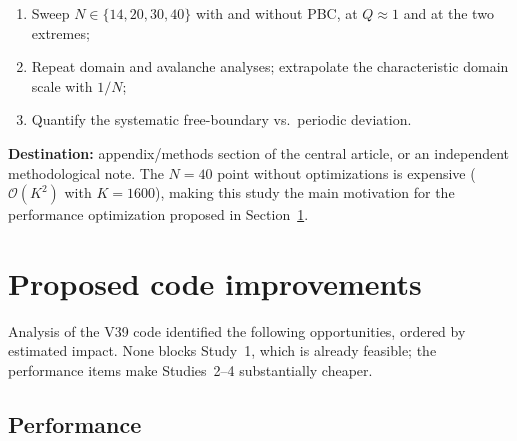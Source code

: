 \documentclass[11pt,a4paper]{article}
\begin{document}
\begin{enumerate}
\item Sweep $N \in \{14, 20, 30, 40\}$ with and without PBC, at $Q \approx 1$ and at the two extremes;
\item Repeat domain and avalanche analyses; extrapolate the characteristic domain scale with $1/N$;
\item Quantify the systematic free-boundary vs.\ periodic deviation.
\end{enumerate}

\textbf{Destination:} appendix/methods section of the central article, or an independent methodological note. The $N = 40$ point without optimizations is expensive ($\mathcal{O}(K^2)$ with $K = 1600$), making this study the main motivation for the performance optimization proposed in Section~\ref{sec:melhorias}.

\section{Proposed code improvements}
\label{sec:melhorias}

Analysis of the V39 code identified the following opportunities, ordered by estimated impact. None blocks Study~1, which is already feasible; the performance items make Studies~2--4 substantially cheaper.

\subsection{Performance}
\end{document}

